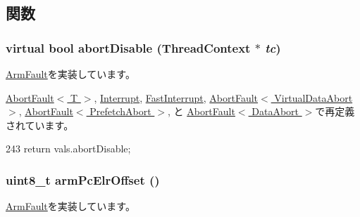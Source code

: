 \subsection{関数}
\hypertarget{classArmISA_1_1ArmFaultVals_a1f1a5b662b9a505415dd5ef1f52892f3}{
\subsubsection[{abortDisable}]{\setlength{\rightskip}{0pt plus 5cm}virtual bool abortDisable ({\bf ThreadContext} $\ast$ {\em tc})}}
\label{classArmISA_1_1ArmFaultVals_a1f1a5b662b9a505415dd5ef1f52892f3}


\hyperlink{classArmISA_1_1ArmFault_a159a2321e7b2cdb89571d6bb04064c4a}{ArmFault}を実装しています。

\hyperlink{classArmISA_1_1AbortFault_a92a741baab278ed029d84b0fe979e1b8}{AbortFault$<$ T $>$}, \hyperlink{classArmISA_1_1Interrupt_a92a741baab278ed029d84b0fe979e1b8}{Interrupt}, \hyperlink{classArmISA_1_1FastInterrupt_a92a741baab278ed029d84b0fe979e1b8}{FastInterrupt}, \hyperlink{classArmISA_1_1AbortFault_a92a741baab278ed029d84b0fe979e1b8}{AbortFault$<$ VirtualDataAbort $>$}, \hyperlink{classArmISA_1_1AbortFault_a92a741baab278ed029d84b0fe979e1b8}{AbortFault$<$ PrefetchAbort $>$}, と \hyperlink{classArmISA_1_1AbortFault_a92a741baab278ed029d84b0fe979e1b8}{AbortFault$<$ DataAbort $>$}で再定義されています。


\begin{DoxyCode}
243 { return vals.abortDisable; }
\end{DoxyCode}
\hypertarget{classArmISA_1_1ArmFaultVals_a951709b498aaf37b7361af330f767def}{
\subsubsection[{armPcElrOffset}]{\setlength{\rightskip}{0pt plus 5cm}uint8\_\-t armPcElrOffset ()}}
\label{classArmISA_1_1ArmFaultVals_a951709b498aaf37b7361af330f767def}


\hyperlink{classArmISA_1_1ArmFault_ac6225f20625dd9cd1d2ff5a5813ccb56}{ArmFault}を実装しています。



